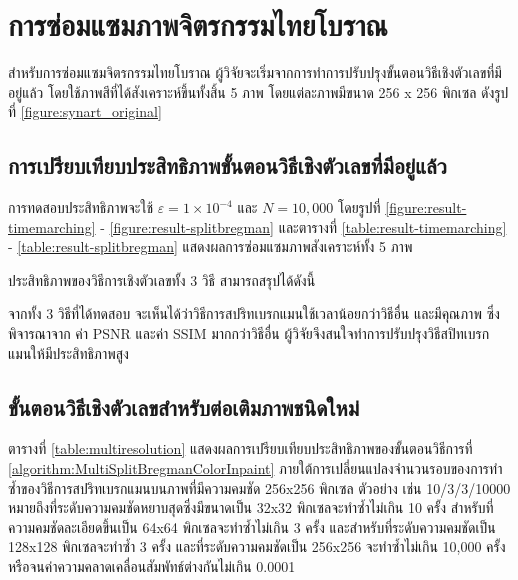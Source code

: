 \section{การซ่อมแซมภาพจิตรกรรมไทยโบราณ}
\hspace{1cm} สำหรับการซ่อมแซมจิตรกรรมไทยโบราณ ผู้วิจัยจะเริ่มจากการทำการปรับปรุงขั้นตอนวิธีเชิงตัวเลขที่มีอยู่แล้ว โดยใช้ภาพสีที่ได้สังเคราะห์ขึ้นทั้งสิ้น 5 ภาพ โดยแต่ละภาพมีขนาด 256 x 256 พิกเซล ดังรูปที่ \ref{figure:synart_original}




\subsection{การเปรียบเทียบประสิทธิภาพขั้นตอนวิธีเชิงตัวเลขที่มีอยู่แล้ว}
\hspace{1cm}
การทดสอบประสิทธิภาพจะใช้ $\varepsilon = 1 \times 10^{-4}$ และ $N= 10,000$ โดยรูปที่ \ref{figure:result-timemarching} - \ref{figure:result-splitbregman} และตารางที่ \ref{table:result-timemarching} - \ref{table:result-splitbregman} แสดงผลการซ่อมแซมภาพสังเคราะห์ทั้ง 5 ภาพ





	





\hspace{1cm} ประสิทธิภาพของวิธีการเชิงตัวเลขทั้ง 3 วิธี สามารถสรุปได้ดังนี้

\hspace{1cm} 
จากทั้ง 3 วิธีที่ได้ทดสอบ จะเห็นได้ว่าวิธีการสปริทเบรกแมนใช้เวลาน้อยกว่าวิธีอื่น และมีคุณภาพ ซึ่งพิจารณาจาก ค่า PSNR และค่า SSIM มากกว่าวิธีอื่น ผู้วิจัยจึงสนใจทำการปรับปรุงวิธีสปิทเบรกแมนให้มีประสิทธิภาพสูง

\subsection{ขั้นตอนวิธีเชิงตัวเลขสำหรับต่อเติมภาพชนิดใหม่}

\hspace{1cm} ตารางที่ \ref{table:multiresolution} แสดงผลการเปรียบเทียบประสิทธิภาพของขั้นตอนวิธีการที่ \ref{algorithm:MultiSplitBregmanColorInpaint} ภายใต้การเปลี่ยนแปลงจำนวนรอบของการทำซ้ำของวิธีการสปริทเบรกแมนบนภาพที่มีความคมชัด 256x256 พิกเซล ตัวอย่าง เช่น 10/3/3/10000 หมายถึงที่ระดับความคมชัดหยาบสุดซึ่งมีขนาดเป็น 32x32 พิกเซลจะทำซ้ำไม่เกิน 10 ครั้ง สำหรับที่ความคมชัดละเอียดขึ้นเป็น 64x64 พิกเซลจะทำซ้ำไม่เกิน 3 ครั้ง และสำหรับที่ระดับความคมชัดเป็น 128x128 พิกเซลจะทำซ้ำ 3 ครั้ง และที่ระดับความคมชัดเป็น 256x256 จะทำซ้ำไม่เกิน 10,000 ครั้งหรือจนค่าความคลาดเคลื่อนสัมพัทธ์ต่างกันไม่เกิน 0.0001 
	
